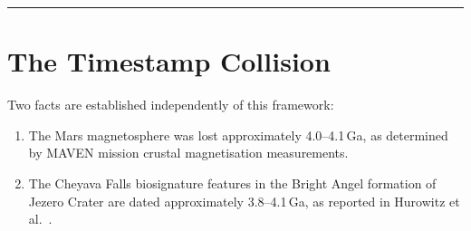 \documentclass[11pt, a4paper]{article}
\begin{document}
\vspace{1em}

\begin{abstract}
\noindent
We present a pre-registered geometric prediction
concerning the directional ambiguity in the Cheyava
Falls biosignature record on Mars.
The magnetic field loss of Mars ($\sim$4.0--4.1\,Ga)
and the Cheyava Falls deposition age
($\sim$3.8--4.1\,Ga) are coincident within
measurement error, creating a fundamental directional
ambiguity: the fossil may represent life establishing
itself (emergence) or life in terminal decline
(collapse).
We derive two mutually exclusive predictions from
attractor geometry that are testable by the complexity
gradient in the Mars subsurface sedimentary record,
to be resolved by Mars sample return.
We additionally present the water attractor state
cascade model, which identifies three distinct
chemical attractor states of planetary water chemistry
and the biological grades each supports.
We present the two-axis LECA stabilisation model,
which identifies independent nitrogen and oxygen
destabilisation axes that together define the
conditions under which the LECA attractor is the
stable state of carbon chemistry.
All derivations are from geometric first principles.
This document is the pre-registration of the
complexity gradient prediction before the Mars sample
return mission retrieves material from the Jezero
Crater sedimentary record.
\end{abstract}

\vspace{0.5em}
\noindent\textcolor{rulecolor}{\rule{\linewidth}{0.6pt}}

\section{The Timestamp Collision}

Two facts are established independently of this
framework:

\begin{enumerate}[leftmargin=*, label=(\arabic*)]
\item The Mars magnetosphere was lost approximately
  4.0--4.1\,Ga, as determined by MAVEN mission crustal
  magnetisation measurements.
\item The Cheyava Falls biosignature features in the
  Bright Angel formation of Jezero Crater are dated
  approximately 3.8--4.1\,Ga, as reported in
  Hurowitz et al.\ \cite{hurowitz2025}.
\end{enumerate}
\end{document}

